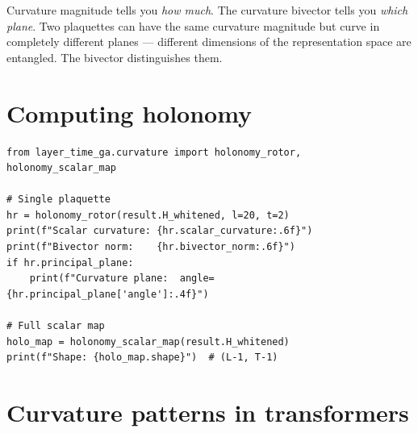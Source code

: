 \documentclass[11pt, twoside, openright]{memoir}
\numberwithin{equation}{chapter}
\begin{document}
\begin{keyidea}
Curvature magnitude tells you \emph{how much}.  The curvature bivector
tells you \emph{which plane}.  Two plaquettes can have the same
curvature magnitude but curve in completely different planes ---
different dimensions of the representation space are entangled.  The
bivector distinguishes them.
\end{keyidea}

\section{Computing holonomy}

\begin{lstlisting}[caption={Holonomy at a single plaquette}]
from layer_time_ga.curvature import holonomy_rotor, holonomy_scalar_map

# Single plaquette
hr = holonomy_rotor(result.H_whitened, l=20, t=2)
print(f"Scalar curvature: {hr.scalar_curvature:.6f}")
print(f"Bivector norm:    {hr.bivector_norm:.6f}")
if hr.principal_plane:
    print(f"Curvature plane:  angle={hr.principal_plane['angle']:.4f}")

# Full scalar map
holo_map = holonomy_scalar_map(result.H_whitened)
print(f"Shape: {holo_map.shape}")  # (L-1, T-1)
\end{lstlisting}

\section{Curvature patterns in transformers}
\end{document}
